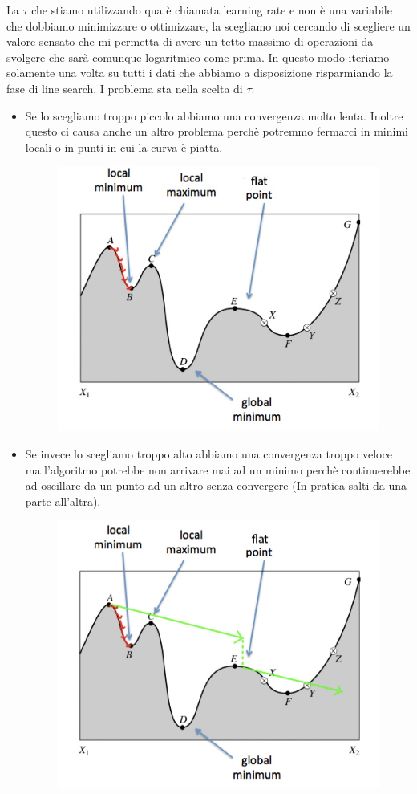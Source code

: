 \documentclass[14pt]{extreport}
\begin{document}
La $\tau$ che stiamo utilizzando qua è chiamata learning rate e non è una variabile che dobbiamo minimizzare o ottimizzare, la scegliamo noi cercando
di scegliere un valore sensato che mi permetta di avere un tetto massimo di operazioni da svolgere che sarà comunque logaritmico come prima. In questo
modo iteriamo solamente una volta su tutti i dati che abbiamo a disposizione risparmiando la fase di line search. I problema sta nella scelta di
$\tau$:
\begin{itemize}
\item Se lo scegliamo troppo piccolo abbiamo una convergenza molto lenta. Inoltre questo ci causa anche un altro problema perchè potremmo fermarci in
minimi locali o in punti in cui la curva è piatta.
\begin{figure}[H]
\centering
\includegraphics[width=0.7\linewidth]{247.jpeg}
\end{figure}
\item Se invece lo scegliamo troppo alto abbiamo una convergenza troppo veloce ma l'algoritmo potrebbe non arrivare mai ad un minimo perchè
continuerebbe ad oscillare da un punto ad un altro senza convergere (In pratica salti da una parte all'altra). 
\begin{figure}[H]
\centering
\includegraphics[width=0.7\linewidth]{248.jpeg}
\end{figure}
\end{itemize}
\end{document}
